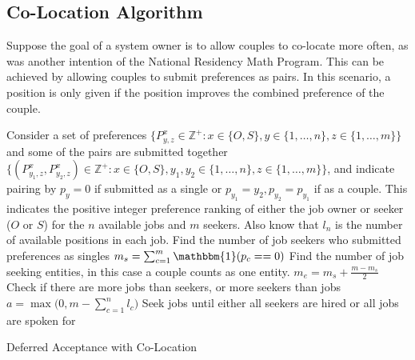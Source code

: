 \subsection{Co-Location Algorithm}

Suppose the goal of a system owner is to allow couples to co-locate more often, as was another intention of the National Residency Math Program. This can be achieved by allowing couples to submit preferences as pairs. In this scenario, a position is only given if the position improves the combined preference of the couple.

\begin{algorithm}[H]
\SetAlgoLined
{} 
 Consider a set of preferences $\{P^{x}_{y,z} \in \mathbb{Z}^+: x \in \{O,S\}, y \in \{1, \dots, n\}, z \in \{1, \dots, m\}\}$ and some of the pairs are submitted together $\{(P^{x}_{y_1,z}, P^{x}_{y_2,z}) \in \mathbb{Z}^+: x \in \{O,S\}, y_1,y_2 \in \{1, \dots, n\}, z \in \{1, \dots, m\}\}$, and indicate pairing by $p_y = 0$ if submitted as a single or $p_{y_1}=y_2, p_{y_2}=p_{y_1}$ if as a couple. This indicates the positive integer preference ranking of either the job owner or seeker ($O$ or $S$) for the $n$ available jobs and $m$ seekers. Also know that $l_n$ is the number of available positions in each job.\;
 Find the number of job seekers who submitted preferences as singles \;
 $m_s =  \sum_{c=1}^m \mathbbm{1}(p_c == 0)$ \;
 Find the number of job seeking entities, in this case a couple counts as one entity. \;
 $m_e = m_s + \frac{m - m_s}{2} $ \;
 Check if there are more jobs than seekers, or more seekers than jobs \;
 $a = \max \big(0, m - \sum_{c = 1}^n l_c \big)$\;
 Seek jobs until either all seekers are hired or all jobs are spoken for \;
 \caption{Deferred Acceptance with Co-Location}
\end{algorithm}

